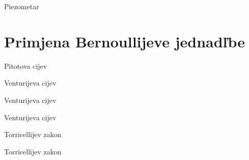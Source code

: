 \documentclass[croatian]{beamer}
\begin{document}
\begin{frame}{Piezometar}

\begin{figure}
\end{figure}
\end{frame}

\section{Primjena Bernoullijeve jednadľbe}

\begin{frame}{Pitotova cijev}

\begin{figure}
\end{figure}
\end{frame}

\begin{frame}{Venturijeva cijev}

\begin{figure}
\end{figure}
\end{frame}

\begin{frame}{Venturijeva cijev}

\begin{figure}
\end{figure}
\end{frame}

\begin{frame}{Venturijeva cijev}

\begin{figure}
\end{figure}
\end{frame}

\begin{frame}{Torricellijev zakon}

\begin{figure}
\end{figure}
\end{frame}

\begin{frame}{Torricellijev zakon}

\begin{figure}
\end{figure}
\end{frame}
\end{document}
